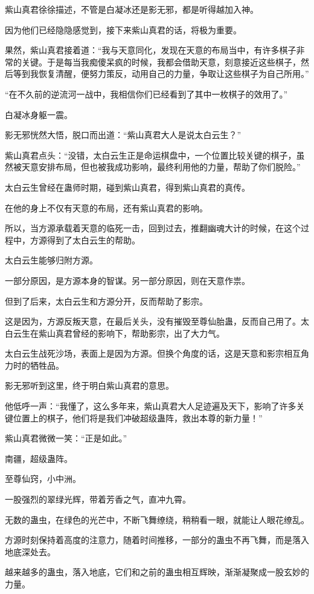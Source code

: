 \begin{this_body}
紫山真君徐徐描述，不管是白凝冰还是影无邪，都是听得越加入神。

因为他们已经隐隐感觉到，接下来紫山真君的话，将极为重要。

果然，紫山真君接着道：“我与天意同化，发现在天意的布局当中，有许多棋子非常的关键。于是每当我痴傻呆疯的时候，我都会借助天意，刻意接近这些棋子，然后等到我恢复清醒，便努力策反，动用自己的力量，争取让这些棋子为自己所用。”

“在不久前的逆流河一战中，我相信你们已经看到了其中一枚棋子的效用了。”

白凝冰身躯一震。

影无邪恍然大悟，脱口而出道：“紫山真君大人是说太白云生？”

紫山真君点头：“没错，太白云生正是命运棋盘中，一个位置比较关键的棋子，虽然被天意安排布局，但也被我成功影响，最终利用他的力量，帮助了你们脱险。”

太白云生曾经在蛊师时期，碰到紫山真君，得到紫山真君的真传。

在他的身上不仅有天意的布局，还有紫山真君的影响。

所以，当方源承载着天意的临死一击，回到过去，推翻幽魂大计的时候，在这个过程中，方源得到了太白云生的帮助。

太白云生能够归附方源。

一部分原因，是方源本身的智谋。另一部分原因，则在天意作祟。

但到了后来，太白云生和方源分开，反而帮助了影宗。

这是因为，方源反叛天意，在最后关头，没有摧毁至尊仙胎蛊，反而自己用了。太白云生在紫山真君曾经的影响下，帮助影宗，出了大力气。

太白云生战死沙场，表面上是因为方源。但换个角度的话，这是天意和影宗相互角力时的牺牲品。

影无邪听到这里，终于明白紫山真君的意思。

他低呼一声：“我懂了，这么多年来，紫山真君大人足迹遍及天下，影响了许多关键位置上的棋子，他们将是我们冲破超级蛊阵，救出本尊的新力量！”

紫山真君微微一笑：“正是如此。”

南疆，超级蛊阵。

至尊仙窍，小中洲。

一股强烈的翠绿光辉，带着芳香之气，直冲九霄。

无数的蛊虫，在绿色的光芒中，不断飞舞缭绕，稍稍看一眼，就能让人眼花缭乱。

方源时刻保持着高度的注意力，随着时间推移，一部分的蛊虫不再飞舞，而是落入地底深处去。

越来越多的蛊虫，落入地底，它们和之前的蛊虫相互辉映，渐渐凝聚成一股玄妙的力量。


\end{this_body}
